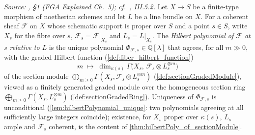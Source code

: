 \begin{definition}\leanok
  \label{def:hilbert_polynomial}
  \textit{Source: \cite{nitsure-hilbert-quot}, \S 1 (FGA Explained Ch.~5); cf.\ \cite{hartshorne-ag},
  III.5.2.}
  Let \(X \to S\) be a finite-type morphism of noetherian schemes and let \(L\)
  be a line bundle on \(X\). For a coherent sheaf \(\mathcal{F}\) on \(X\) whose
  schematic support is proper over \(S\) and a point \(s \in S\), write \(X_s\)
  for the fibre over \(s\), \(\mathcal{F}_s = \mathcal{F}|_{X_s}\) and
  \(L_s = L|_{X_s}\). The \emph{Hilbert polynomial of \(\mathcal{F}\) at \(s\)
  relative to \(L\)} is the unique polynomial
  \(\Phi_{\mathcal{F},s} \in \mathbb{Q}[\lambda]\) that agrees, for all
  \(m \gg 0\), with the graded Hilbert function
  (\cref{def:fiber_hilbert_function})
  \[
    m \;\longmapsto\; \dim_{\kappa(s)} \Gamma\bigl(X_s,\, \mathcal{F}_s \otimes L_s^{\otimes m}\bigr)
  \]
  of the section module
  \(\bigoplus_{m \ge 0} \Gamma(X_s, \mathcal{F}_s \otimes L_s^{\otimes m})\)
  (\cref{def:sectionGradedModule}), viewed as a finitely generated graded module
  over the homogeneous section ring
  \(\bigoplus_{m \ge 0} \Gamma(X_s, L_s^{\otimes m})\)
  (\cref{def:sectionGradedRing}). Uniqueness of \(\Phi_{\mathcal{F},s}\) is
  unconditional (\cref{lem:hilbertPolynomial_unique}: two polynomials agreeing
  at all sufficiently large integers coincide); existence, for \(X_s\) proper
  over \(\kappa(s)\), \(L_s\) ample and \(\mathcal{F}_s\) coherent, is the
  content of \cref{thm:hilbertPoly_of_sectionModule}.


\end{definition}

